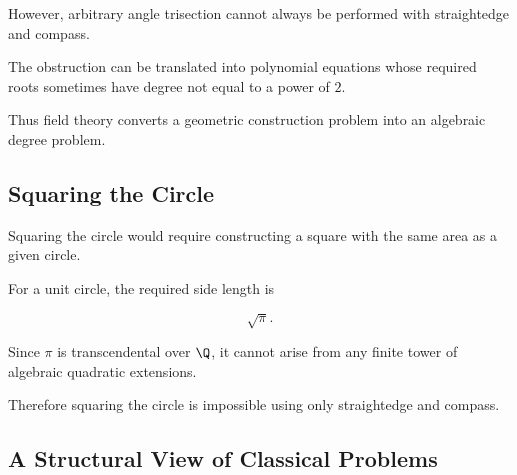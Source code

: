 However, arbitrary angle trisection cannot always be performed with
straightedge and compass.

The obstruction can be translated into polynomial equations whose required
roots sometimes have degree not equal to a power of \(2\).

Thus field theory converts a geometric construction problem into an
algebraic degree problem.

\subsection{Squaring the Circle}
\label{subsec:squaring-circle}

Squaring the circle would require constructing a square with the same area as
a given circle.

For a unit circle, the required side length is

\[ \sqrt{\pi}. \]

Since \(\pi\) is transcendental over \(\Q\), it cannot arise from any finite
tower of algebraic quadratic extensions.

Therefore squaring the circle is impossible using only straightedge and
compass.

\subsection{A Structural View of Classical Problems}
\label{subsec:classical-problems-visual}

\begin{center}
\end{center}

